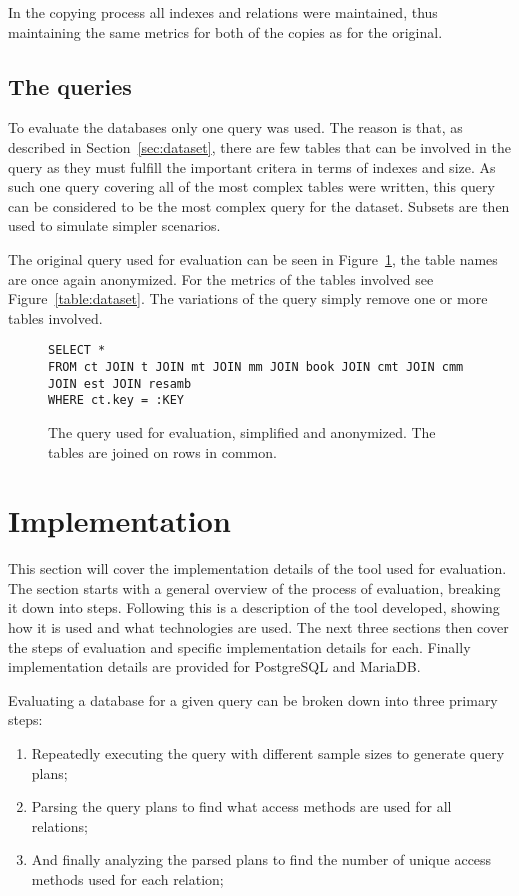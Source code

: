 In the copying process all indexes and relations were maintained, thus
maintaining the same metrics for both of the copies as for the original.

\subsection{The queries}\label{sec:queries}
To evaluate the databases only one query was used. The
reason is that, as described in Section~\ref{sec:dataset}, there are few tables that can be
involved in the query as they must fulfill the important critera in terms of
indexes and size. As such one query covering all of the most complex tables were
written, this query can be considered to be the most complex query for the
dataset. Subsets are then used to simulate simpler scenarios.

The original query used for evaluation can be seen in
Figure~\ref{fig:sql:query1}, the table names are once again anonymized. For the
metrics of the tables involved see Figure~\ref{table:dataset}. The variations of
the query simply remove one or more tables involved.

\begin{figure}[ht]
\begin{verbatim}
SELECT *
FROM ct JOIN t JOIN mt JOIN mm JOIN book JOIN cmt JOIN cmm JOIN est JOIN resamb
WHERE ct.key = :KEY
\end{verbatim}
    \caption[ The original query used for evaluation ]{The query used for
      evaluation, simplified and anonymized. The tables are joined on rows in
      common.}\label{fig:sql:query1}
\end{figure}

\section{Implementation}\label{sec:implementation}
This section will cover the implementation details of the tool used for
evaluation. The section starts with a general overview of the process of
evaluation, breaking it down into steps. Following this is a description of the
tool developed, showing how it is used and what technologies are used.
The next three sections then cover the steps of evaluation and specific
implementation details for each. Finally implementation details are provided for
PostgreSQL and MariaDB.

Evaluating a database for a given query can be broken down into three primary steps:
\begin{enumerate}
\item Repeatedly executing the query with different sample sizes to generate
  query plans;
\item Parsing the query plans to find what access methods are used for all
  relations;
\item And finally analyzing the parsed plans to find the number of unique access
  methods used for each relation;
\end{enumerate}

